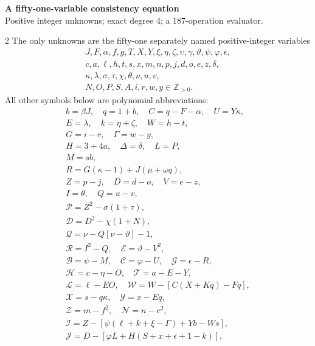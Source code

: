 \documentclass[10pt]{article}
\begin{document}
\begin{center}
{\large\bfseries A fifty-one-variable consistency equation}\\[-1pt]
{\small Positive integer unknowns; exact degree 4; a 187-operation evaluator.}
\end{center}\vspace{-8pt}
\begin{multicols}{2}
\fontsize{8.6}{9.1}\selectfont
The only unknowns are the fifty-one separately named positive-integer variables
\[
\begin{gathered}J,F,\alpha,f,g,T,X,Y,\xi,\eta,\zeta,\upsilon,\gamma,\vartheta,\psi,\varphi,\epsilon,\\
c,a,\ell,h,t,s,x,m,n,p,j,d,o,e,z,\delta,\\
\kappa,\lambda,\sigma,\tau,\chi,\theta,\nu,u,v,\\
N,O,P,S,A,i,r,w,y\in\mathbb Z_{>0}.\end{gathered}
\]
All other symbols below are polynomial abbreviations:
\[
\begin{gathered}
b=\beta J,\quad q=1+b,\quad C=q-F-\alpha,\quad U=Y\kappa,\\
E=\lambda,\quad k=\eta+\zeta,\quad W=h-t,\\
G=i-r,\quad\Gamma=w-y,\\
H=3+4a,\quad\Delta=\delta,\quad L=P,\\
M=sb,\\
R=G(\kappa-1)+J(\mu+\omega q),\\
Z=p-j,\quad D=d-o,\quad V=e-z,\\
I=\theta,\quad Q=u-v,\\
\mathcal{P}=Z^2-\sigma(1+\tau),\\
\mathcal{D}=D^2-\chi(1+N),\\
\mathcal{Q}=\nu-Q[\nu-\vartheta]-1,\\
\mathcal{R}=I^2-Q,\quad \mathcal{E}=\vartheta-V^2,\\
\mathcal{B}=\psi-M,\quad \mathcal{C}=\varphi-U,\quad \mathcal{G}=\epsilon-R,\\
\mathcal{H}=c-\eta-O,\quad \mathcal{T}=a-E-Y,\\
\mathcal{L}=\ell-EO,\quad \mathcal{W}=W-[C(X+Kq)-Fq],\\
\mathcal{X}=s-q\kappa,\quad \mathcal{Y}=x-Eq,\\
\mathcal{Z}=m-f^2,\quad \mathcal{N}=n-c^2,\\
\mathcal{I}=Z-[\psi(\ell+k+\xi-\Gamma)+Yb-Ws],\\
\mathcal{J}=D-[\varphi L+H(S+x+\epsilon+1-k)],\\

\end{gathered}\]
\end{multicols}
\end{document}
